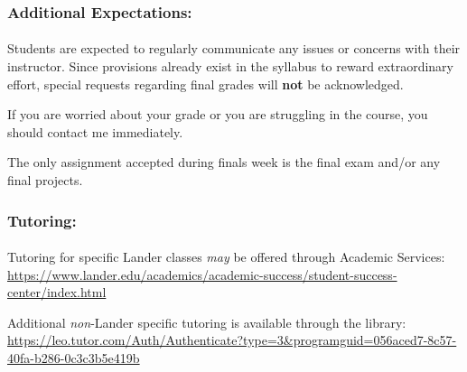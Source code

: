 \documentclass{article}
\begin{document}
    \begin{samepage}
      \subsubsection*{Additional Expectations:}
        \paragraph*{}
        Students are expected to regularly communicate any issues or concerns with their instructor.
        Since provisions already exist in the syllabus to reward extraordinary effort, special requests regarding final grades will \textbf{not} be acknowledged.

        If you are worried about your grade or you are struggling in the course, you should contact me immediately.\href{https://www.youtube.com/watch?v=WVvKnq5XT-g}{}

        The only assignment accepted during finals week is the final exam and/or any final projects.

    \end{samepage}

    \begin{samepage}
      \subsubsection*{Tutoring:}
        \paragraph*{}
        Tutoring for specific Lander classes \emph{may} be offered through Academic Services:\newline
        \href{https://www.lander.edu/academics/academic-success/student-success-center/index.html}{https://www.lander.edu/academics/academic-success/student-success-center/index.html}

        Additional \emph{non}-Lander specific tutoring is available through the library:\newline
        \href{https://leo.tutor.com/Auth/Authenticate?type=3&programguid=056aced7-8c57-40fa-b286-0c3c3b5e419b}{https://leo.tutor.com/Auth/Authenticate?type=3\&programguid=056aced7-8c57-40fa-b286-0c3c3b5e419b}

    \end{samepage}
\end{document}
